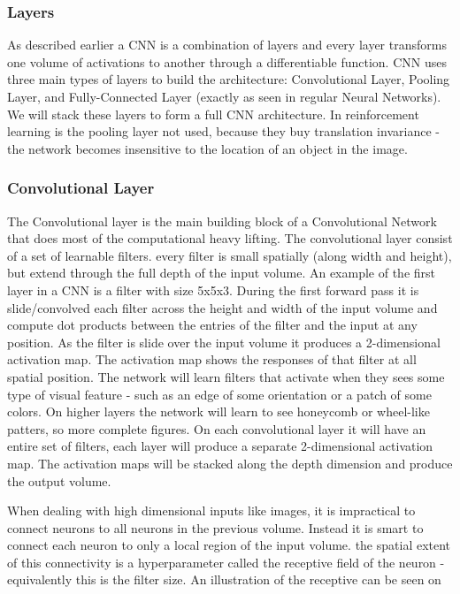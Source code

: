\subsubsection*{Layers}
As described earlier a CNN is a combination of layers and every layer transforms one volume of activations to another  through a differentiable function. CNN uses three main types of layers to build the architecture: Convolutional Layer, Pooling Layer, and Fully-Connected Layer (exactly as seen in regular Neural Networks). We will stack these layers to form a full CNN architecture. In reinforcement learning is the pooling layer not used, because they buy translation invariance - the network becomes insensitive to the location of an object in the image.

\subsubsection*{Convolutional Layer}
The Convolutional layer is the main building block of a Convolutional Network that does most of the computational heavy lifting. The convolutional layer consist of a set of learnable filters. every filter is small spatially (along width and height), but extend through the full depth of the input volume. An example of the first layer in a CNN is a filter with size 5x5x3. During the first forward pass it is slide/convolved each filter across the height and width of the input volume and compute dot products between the entries of the filter and the input at any position. As the filter is slide over the input volume it produces a 2-dimensional activation map. The activation map shows the responses of that filter at all spatial position. The network will learn filters that activate when they sees some type of visual feature - such as an edge of some orientation or a patch of some colors. On higher layers the network will learn to see honeycomb or wheel-like patters, so more complete figures. On each convolutional layer it will have an entire set of filters, each layer will produce a separate 2-dimensional activation map. The activation maps will be stacked along the depth dimension and produce the output volume. 

When dealing with high dimensional inputs like images, it is impractical to connect neurons to all neurons in the previous volume. Instead it is smart to connect each neuron to only a local region of the input volume. the spatial extent of this connectivity is a hyperparameter  called the receptive field of the neuron - equivalently this is the filter size. An illustration of the receptive can be seen on 


